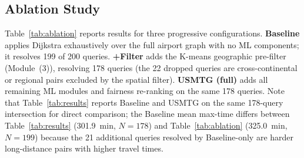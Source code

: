\documentclass[review]{elsarticle}
\begin{document}
\subsection{Ablation Study}

Table~\ref{tab:ablation} reports results for three progressive configurations.
\textbf{Baseline} applies Dijkstra exhaustively over the full airport graph with no ML components; it resolves 199 of 200 queries.
\textbf{+Filter} adds the K-means geographic pre-filter (Module~(3)), resolving 178 queries (the 22 dropped queries are cross-continental or regional pairs excluded by the spatial filter).
\textbf{USMTG (full)} adds all remaining ML modules and fairness re-ranking on the same 178 queries.
Note that Table~\ref{tab:results} reports Baseline and USMTG on the same 178-query intersection for direct comparison; the Baseline mean max-time differs between Table~\ref{tab:results} (301.9~min, $N=178$) and Table~\ref{tab:ablation} (325.0~min, $N=199$) because the 21 additional queries resolved by Baseline-only are harder long-distance pairs with higher travel times.
\end{document}
